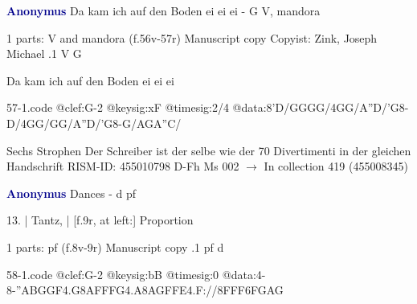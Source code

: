 \documentclass[twocolumn]{book}
\begin{document}
\newline \par \vspace{7pt} \textcolor{darkblue}{\textbf{Anonymus  }}
\newline Da kam ich auf den Boden ei ei ei - G
\newline V, mandora
\newline \begin{itshape}\end{itshape} 
\newline \textcolor{darkblue}{}  1 parts: V and mandora  (f.56v-57r)
\newline Manuscript copy
\newline Copyist: Zink, Joseph Michael
.1  V  G
\newline \begin{footnotesize} Da kam ich auf den Boden ei ei ei \end{footnotesize}  
\begin{filecontents*}{57-1.code}
@clef:G-2
@keysig:xF
@timesig:2/4
@data:8'D/GGGG/4GG/A''D/'G8-D/4GG/GG/A''D/'G8-G/AGA''C/
\end{filecontents*}
\newline
%

\newline Sechs Strophen
\newline Der Schreiber ist der selbe wie der 70 Divertimenti in der gleichen Handschrift
\newline RISM-ID: 455010798
\newline D-Fh  Ms 002
\newline $\rightarrow$ In collection 419 (455008345)
      
\newline \par \vspace{7pt} \textcolor{darkblue}{\textbf{Anonymus  }}
\newline Dances - d
\newline pf
\newline \begin{itshape}[f.8v, at left:] 13. | Tantz, | [f.9r, at left:] Proportion\end{itshape} 
\newline \textcolor{darkblue}{}  1 parts: pf  (f.8v-9r)
\newline Manuscript copy
.1  pf  d  
\begin{filecontents*}{58-1.code}
@clef:G-2
@keysig:bB
@timesig:0
@data:4-8-''A{BGGF}4.G8A{FFFG}4.A8A{GFFE}4.F://8F{FF}{6FGAG}
\end{filecontents*}
\newline
%
\end{document}
